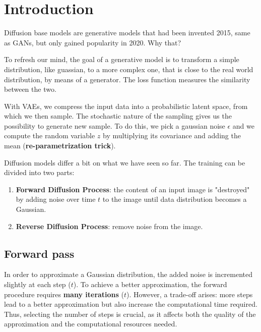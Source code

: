 \section{Introduction}

Diffusion base models are generative models that had been invented 2015, same as GANs, but only gained popularity in 2020. Why that?

To refresh our mind, the goal of a generative model is to transform a simple distribution, like guassian, to a more complex one, that is close to the real world distribution, by means of a generator. The loss function measures the similarity between the two.

With VAEs, we compress the input data into a probabilistic latent space, from which we then sample. The stochastic nature of the sampling gives us the possibility to generate new sample. To do this,  we pick  a gaussian noise $\epsilon$ and we compute the random variable $z$ by multiplying its covariance and adding the mean  (\textbf{re-parametrization trick}).


Diffusion models differ a bit on what we have seen so far. The training can be divided into two parts:

\begin{enumerate}[H]
    \item \textbf{Forward Diffusion Process}: the content of an input image is "destroyed" by  adding noise over time $t$ to the image until data distribution becomes a Gaussian.

    \item \textbf{Reverse Diffusion Process}:  remove noise from the image.
\end{enumerate}

\subsection{Forward pass}

In order to approximate a Gaussian distribution, the added noise is incremented slightly at each step ($t$). To achieve a better approximation, the forward procedure requires \textbf{many iterations} ($t$). However, a trade-off arises: more steps lead to a better approximation but also increase the computational time required. Thus, selecting the number of steps is crucial, as it affects both the quality of the approximation and the computational resources needed.




